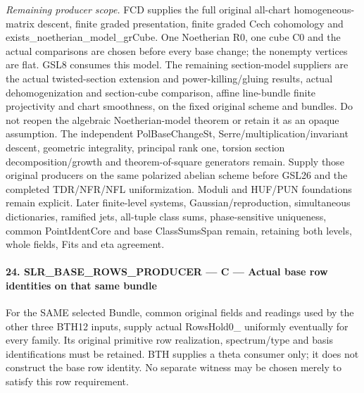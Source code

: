 \emph{Remaining producer scope.} FCD supplies the full original all-chart homogeneous-matrix descent, finite graded presentation, finite graded Cech cohomology and exists\_\allowbreak noetherian\_\allowbreak model\_\allowbreak grCube. One Noetherian R0, one cube C0 and the actual comparisons are chosen before every base change; the nonempty vertices are flat. GSL8 consumes this model. The remaining section-model suppliers are the actual twisted-section extension and power-killing/gluing results, actual dehomogenization and section-cube comparison, affine line-bundle finite projectivity and chart smoothness, on the fixed original scheme and bundles. Do not reopen the algebraic Noetherian-model theorem or retain it as an opaque assumption. The independent PolBaseChangeSt, Serre/multiplication/invariant descent, geometric integrality, principal rank one, torsion section decomposition/growth and theorem-of-square generators remain. Supply those original producers on the same polarized abelian scheme before GSL26 and the completed TDR/NFR/NFL uniformization. Moduli and HUF/PUN foundations remain explicit. Later finite-level systems, Gaussian/reproduction, simultaneous dictionaries, ramified jets, all-tuple class sums, phase-sensitive uniqueness, common PointIdentCore and base ClassSumsSpan remain, retaining both levels, whole fields, Fits and eta agreement.



\paragraph{24. SLR\_\allowbreak BASE\_\allowbreak ROWS\_\allowbreak PRODUCER — C — Actual base row identities on that same bundle}

For the SAME selected Bundle, common original fields and readings used by the other three BTH12 inputs, supply actual RowsHold0\_ uniformly eventually for every family. Its original primitive row realization, spectrum/type and basis identifications must be retained. BTH supplies a theta consumer only; it does not construct the base row identity. No separate witness may be chosen merely to satisfy this row requirement.


